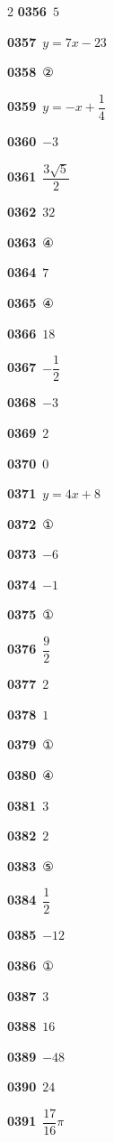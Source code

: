 \documentclass[10pt,a4paper]{article}
\begin{document}
\begin{multicols}{2}
\noindent\textbf{0356}\ $5$\par
\noindent\textbf{0357}\ $y=7x-23$\par
\noindent\textbf{0358}\ ②\par
\noindent\textbf{0359}\ $y=-x+\dfrac{1}{4}$\par
\noindent\textbf{0360}\ $-3$\par
\noindent\textbf{0361}\ $\dfrac{3\sqrt{5}}{2}$\par
\noindent\textbf{0362}\ $32$\par
\noindent\textbf{0363}\ ④\par
\noindent\textbf{0364}\ $7$\par
\noindent\textbf{0365}\ ④\par
\noindent\textbf{0366}\ $18$\par
\noindent\textbf{0367}\ $-\dfrac{1}{2}$\par
\noindent\textbf{0368}\ $-3$\par
\noindent\textbf{0369}\ $2$\par
\noindent\textbf{0370}\ $0$\par
\noindent\textbf{0371}\ $y=4x+8$\par
\noindent\textbf{0372}\ ①\par
\noindent\textbf{0373}\ $-6$\par
\noindent\textbf{0374}\ $-1$\par
\noindent\textbf{0375}\ ①\par
\noindent\textbf{0376}\ $\dfrac{9}{2}$\par
\noindent\textbf{0377}\ $2$\par
\noindent\textbf{0378}\ $1$\par
\noindent\textbf{0379}\ ①\par
\noindent\textbf{0380}\ ④\par
\noindent\textbf{0381}\ $3$\par
\noindent\textbf{0382}\ $2$\par
\noindent\textbf{0383}\ ⑤\par
\noindent\textbf{0384}\ $\dfrac{1}{2}$\par
\noindent\textbf{0385}\ $-12$\par
\noindent\textbf{0386}\ ①\par
\noindent\textbf{0387}\ $3$\par
\noindent\textbf{0388}\ $16$\par
\noindent\textbf{0389}\ $-48$\par
\noindent\textbf{0390}\ $24$\par
\noindent\textbf{0391}\ $\dfrac{17}{16}\pi$\par

\end{multicols}
\end{document}
